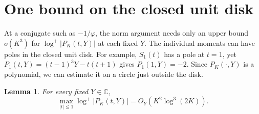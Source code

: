 \documentclass[11pt,letterpaper]{article}
\newtheorem{lemma}[theorem]{Lemma}
\numberwithin{equation}{section}
\newcommand{\C}{\mathbb C}
\begin{document}
\section{One bound on the closed unit disk}\label{sec:disk}

At a conjugate such as \(-1/\varphi\), the norm argument needs only
an upper bound \(o(K^3)\) for \(\log^+|P_K(t,Y)|\) at each fixed \(Y\).
The individual moments can have poles in the
closed unit disk. For example, \(S_1(t)\) has a pole at \(t=1\), yet
\(P_1(t,Y)=(t-1)^3Y-t(t+1)\) gives \(P_1(1,Y)=-2\).
Since \(P_K(\cdot,Y)\) is a polynomial, we can estimate it on a
circle just outside the disk.

\begin{lemma}\label{lem:disk}
For every fixed \(Y\in\C\),
\[
   \max_{|t|\le1}\log^+|P_K(t,Y)|
        = O_Y\!\left(K^2\log^3(2K)\right).
\]
\end{lemma}
\end{document}
